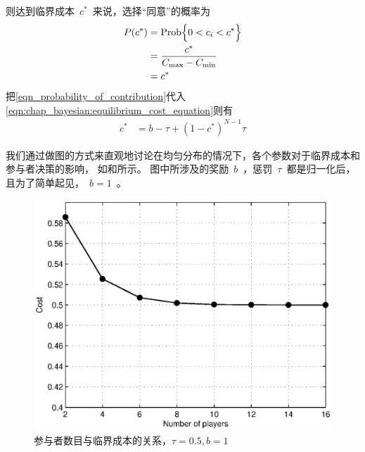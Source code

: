 则达到临界成本~$c^*$~来说，选择“同意”的概率为
\begin{align} 
    P(c^*) &= \text{Prob} \Bigl\{ 0 < c_i < c^*\Bigr\} \notag\\ 
    &= \frac{c^*}{C_{\max}-C_{\min}} \notag\\
    &= c^* 
    \label{eqn_probability_of_contribution} 
\end{align}
把\eqref{eqn_probability_of_contribution}代入\eqref{eqn:chap_bayesian:equilibrium_cost_equation}则有
\begin{align*} 
    c^* &= b - \tau + (1-c^*)^{N-1}\tau
\end{align*}

我们通过做图的方式来直观地讨论在均匀分布的情况下，各个参数对于临界成本和参与者决策的影响，
如和所示。
图中所涉及的奖励~$b$~，惩罚~$\tau$~都是归一化后，且为了简单起见，~$b = 1$~。
\begin{figure}[tb]
\begin{centering}
\includegraphics[scale=0.7]{bayesian_uniform_user_number_vs_contribute_probability.eps}
\caption{参与者数目与临界成本的关系，$\tau=0.5, b=1$}
\label{fig:bayesian_user_numb_vs_contr_prob}
\end{centering}
\end{figure}
